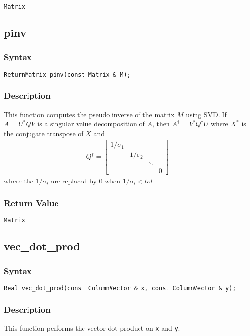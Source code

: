 \documentclass[dvips,11pt,fleqn]{report}
\begin{document}
{\tt Matrix}

\newpage

\subsection*{pinv}
\subsubsection*{Syntax}
\begin{verbatim}
ReturnMatrix pinv(const Matrix & M);
\end{verbatim}
\subsubsection*{Description}
This function computes the pseudo inverse of the matrix $M$ using SVD.
If $ A = U^{*}QV $ is a singular value decomposition of $A$, then $
A^{\dagger} = V^{*}Q^{\dagger}U$ where $ X^{*} $ is the conjugate
transpose of $ X $ and
\begin{eqnarray*}
  Q^{\dagger} = \left [
    \begin{array}{cccc}
      1/\sigma_1 & & & \\
      & 1/\sigma_2& & \\
      &  & \ddots & \\
      &  &  & 0
    \end{array}
  \right ]
\end{eqnarray*}
where the $1/\sigma_i $ are replaced by 0 when $1/\sigma_i < tol $.


\subsubsection*{Return Value}

{\tt Matrix}
\newpage

\subsection*{vec\_dot\_prod}
\subsubsection*{Syntax}
\begin{verbatim}
Real vec_dot_prod(const ColumnVector & x, const ColumnVector & y);
\end{verbatim}
\subsubsection*{Description}
This function performs the vector dot product on {\tt x} and {\tt y}.
\end{document}

